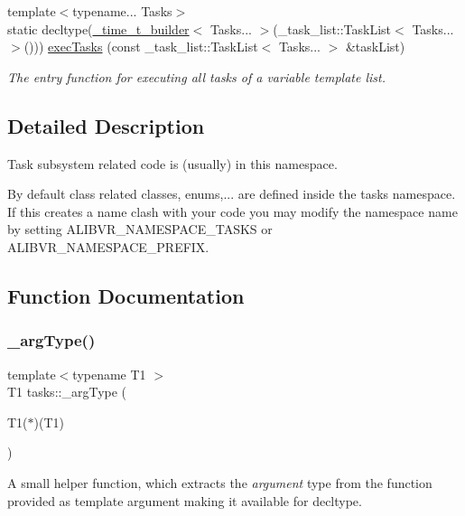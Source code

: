 \begin{DoxyCompactItemize}
{\footnotesize template$<$typename... Tasks$>$ }\\static decltype(\hyperlink{namespacetasks_a9469b8fb917e0f3ec0168293ac046a4c}{\+\_\+time\+\_\+t\+\_\+builder}$<$ Tasks... $>$(\+\_\+task\+\_\+list\+::\+Task\+List$<$ Tasks... $>$())) \hyperlink{namespacetasks_a6590d6a524b4aedb5d0dfef5e1b61bc1}{exec\+Tasks} (const \+\_\+task\+\_\+list\+::\+Task\+List$<$ Tasks... $>$ \&task\+List)
\begin{DoxyCompactList}\small\item\em The entry function for executing all tasks of a variable template list. \end{DoxyCompactList}\end{DoxyCompactItemize}


\subsection{Detailed Description}
Task subsystem related code is (usually) in this namespace. 

By default class related classes, enums,... are defined inside the {\ttfamily tasks} namespace. If this creates a name clash with your code you may modify the namespace name by setting A\+L\+I\+B\+V\+R\+\_\+\+N\+A\+M\+E\+S\+P\+A\+C\+E\+\_\+\+T\+A\+S\+KS or A\+L\+I\+B\+V\+R\+\_\+\+N\+A\+M\+E\+S\+P\+A\+C\+E\+\_\+\+P\+R\+E\+F\+IX. 

\subsection{Function Documentation}
\hypertarget{namespacetasks_ac4a797a86584958bef0b67616a38c8ae}{}\label{namespacetasks_ac4a797a86584958bef0b67616a38c8ae} 
\subsubsection{\texorpdfstring{\+\_\+arg\+Type()}{\_argType()}\hspace{0.1cm}{\footnotesize\ttfamily [1/2]}}
{\footnotesize\ttfamily template$<$typename T1 $>$ \\
T1 tasks\+::\+\_\+arg\+Type (\begin{DoxyParamCaption}\item[{T1($\ast$)(T1)}]{ }\end{DoxyParamCaption})}



A small helper function, which extracts the {\itshape argument} type from the function provided as template argument making it available for decltype. 

